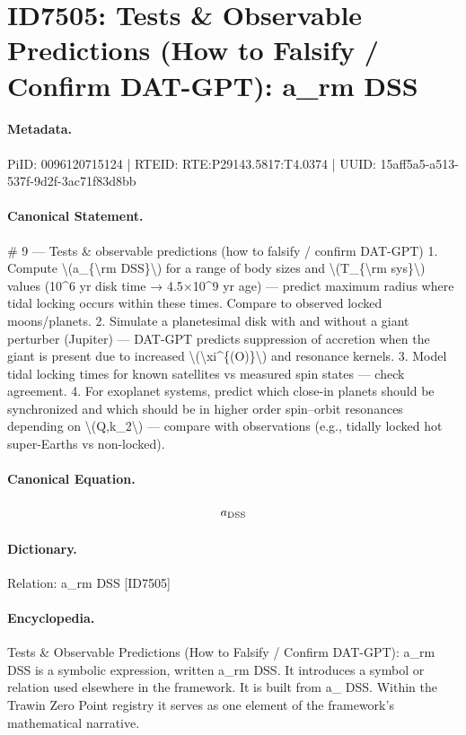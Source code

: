 \section*{ID7505: Tests \& Observable Predictions (How to Falsify / Confirm DAT-GPT): a\_rm DSS}
\paragraph{Metadata.}
PiID: 0096120715124 | RTEID: RTE:P29143.5817:T4.0374 | UUID: 15aff5a5-a513-537f-9d2f-3ac71f83d8bb

\paragraph{Canonical Statement.}
\# 9 — Tests \& observable predictions (how to falsify / confirm DAT-GPT) 1. Compute \textbackslash{}(a\_\{\textbackslash{}rm DSS\}\textbackslash{}) for a range of body sizes and \textbackslash{}(T\_\{\textbackslash{}rm sys\}\textbackslash{}) values (10\textasciicircum{}6 yr disk time → 4.5×10\textasciicircum{}9 yr age) — predict maximum radius where tidal locking occurs within these times. Compare to observed locked moons/planets. 2. Simulate a planetesimal disk with and without a giant perturber (Jupiter) — DAT-GPT predicts suppression of accretion when the giant is present due to increased \textbackslash{}(\textbackslash{}xi\textasciicircum{}\{(O)\}\textbackslash{}) and resonance kernels. 3. Model tidal locking times for known satellites vs measured spin states — check agreement. 4. For exoplanet systems, predict which close-in planets should be synchronized and which should be in higher order spin–orbit resonances depending on \textbackslash{}(Q,k\_2\textbackslash{}) — compare with observations (e.g., tidally locked hot super-Earths vs non-locked).

\paragraph{Canonical Equation.}
\[
a_{\rm DSS}
\]

\paragraph{Dictionary.}
Relation: a\_rm DSS [ID7505]

\paragraph{Encyclopedia.}
Tests \& Observable Predictions (How to Falsify / Confirm DAT-GPT): a\_rm DSS is a symbolic expression, written a\_rm DSS. It introduces a symbol or relation used elsewhere in the framework. It is built from a\_ DSS. Within the Trawin Zero Point registry it serves as one element of the framework's mathematical narrative.
